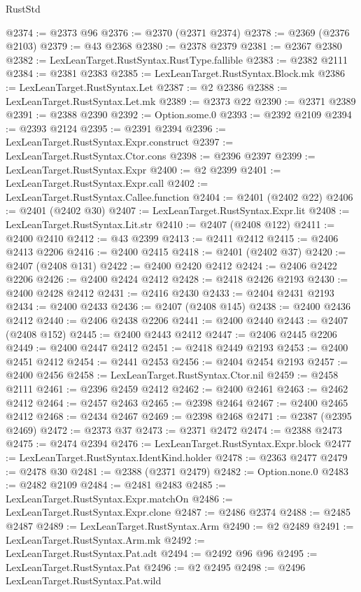 \begin{lexlean}{RustStd}
\begin{coremodule}
{\begin{coremodule}
{{{{{{{{{{{{{{{{{{{{{{{{{{{{{{{{{{{{{{{{{{{{{{{{{{@2374 := @2373 @96
@2376 := @2370 (@2371 @2374)
@2378 := @2369 (@2376 @2103)
@2379 := @43 @2368
@2380 := @2378 @2379
@2381 := @2367 @2380
@2382 := LexLeanTarget.RustSyntax.RustType.fallible
@2383 := @2382 @2111
@2384 := @2381 @2383
@2385 := LexLeanTarget.RustSyntax.Block.mk
@2386 := LexLeanTarget.RustSyntax.Let
@2387 := @2 @2386
@2388 := LexLeanTarget.RustSyntax.Let.mk
@2389 := @2373 @22
@2390 := @2371 @2389
@2391 := @2388 @2390
@2392 := Option.some.{0}
@2393 := @2392 @2109
@2394 := @2393 @2124
@2395 := @2391 @2394
@2396 := LexLeanTarget.RustSyntax.Expr.construct
@2397 := LexLeanTarget.RustSyntax.Ctor.cons
@2398 := @2396 @2397
@2399 := LexLeanTarget.RustSyntax.Expr
@2400 := @2 @2399
@2401 := LexLeanTarget.RustSyntax.Expr.call
@2402 := LexLeanTarget.RustSyntax.Callee.function
@2404 := @2401 (@2402 @22)
@2406 := @2401 (@2402 @30)
@2407 := LexLeanTarget.RustSyntax.Expr.lit
@2408 := LexLeanTarget.RustSyntax.Lit.str
@2410 := @2407 (@2408 @122)
@2411 := @2400 @2410
@2412 := @43 @2399
@2413 := @2411 @2412
@2415 := @2406 @2413 @2206
@2416 := @2400 @2415
@2418 := @2401 (@2402 @37)
@2420 := @2407 (@2408 @131)
@2422 := @2400 @2420 @2412
@2424 := @2406 @2422 @2206
@2426 := @2400 @2424 @2412
@2428 := @2418 @2426 @2193
@2430 := @2400 @2428 @2412
@2431 := @2416 @2430
@2433 := @2404 @2431 @2193
@2434 := @2400 @2433
@2436 := @2407 (@2408 @145)
@2438 := @2400 @2436 @2412
@2440 := @2406 @2438 @2206
@2441 := @2400 @2440
@2443 := @2407 (@2408 @152)
@2445 := @2400 @2443 @2412
@2447 := @2406 @2445 @2206
@2449 := @2400 @2447 @2412
@2451 := @2418 @2449 @2193
@2453 := @2400 @2451 @2412
@2454 := @2441 @2453
@2456 := @2404 @2454 @2193
@2457 := @2400 @2456
@2458 := LexLeanTarget.RustSyntax.Ctor.nil
@2459 := @2458 @2111
@2461 := @2396 @2459 @2412
@2462 := @2400 @2461
@2463 := @2462 @2412
@2464 := @2457 @2463
@2465 := @2398 @2464
@2467 := @2400 @2465 @2412
@2468 := @2434 @2467
@2469 := @2398 @2468
@2471 := @2387 (@2395 @2469)
@2472 := @2373 @37
@2473 := @2371 @2472
@2474 := @2388 @2473
@2475 := @2474 @2394
@2476 := LexLeanTarget.RustSyntax.Expr.block
@2477 := LexLeanTarget.RustSyntax.IdentKind.holder
@2478 := @2363 @2477
@2479 := @2478 @30
@2481 := @2388 (@2371 @2479)
@2482 := Option.none.{0}
@2483 := @2482 @2109
@2484 := @2481 @2483
@2485 := LexLeanTarget.RustSyntax.Expr.matchOn
@2486 := LexLeanTarget.RustSyntax.Expr.clone
@2487 := @2486 @2374
@2488 := @2485 @2487
@2489 := LexLeanTarget.RustSyntax.Arm
@2490 := @2 @2489
@2491 := LexLeanTarget.RustSyntax.Arm.mk
@2492 := LexLeanTarget.RustSyntax.Pat.adt
@2494 := @2492 @96 @96
@2495 := LexLeanTarget.RustSyntax.Pat
@2496 := @2 @2495
@2498 := @2496 LexLeanTarget.RustSyntax.Pat.wild
}}}}}}}}}}}}}}}}}}}}}}}}}}}}}}}}}}}}}}}}}}}}}}}}}}
\end{coremodule}}
\end{coremodule}
\end{lexlean}
